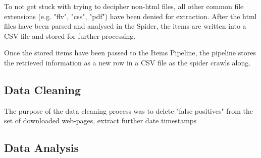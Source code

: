 \noindent
To not get stuck with trying to decipher non-html files, all other common file extensions (e.g. "flv", "css", "pdf") have been denied for extraction. After the html files have been parsed and analysed in the Spider, the items are written into a CSV file and stored for further processing.\par
\noindent
Once the stored items have been passed to the Items Pipeline, the pipeline stores the retrieved information as a new row in a CSV file as the spider crawls along.\par 
%
\subsection{Data Cleaning}
The purpose of the data cleaning process was to delete "false positives" from the set of downloaded web-pages, extract further date timestamps  


\subsection{Data Analysis}




